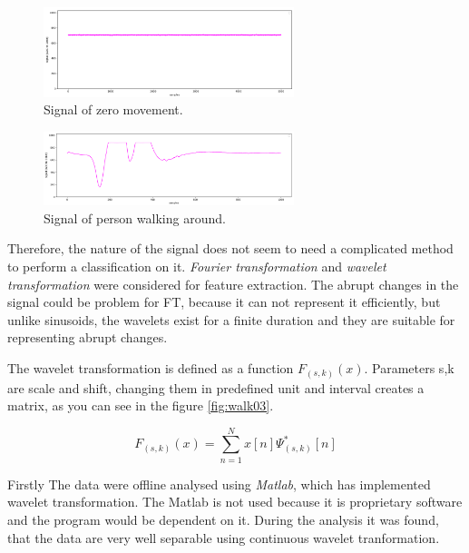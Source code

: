 \begin{figure}[h!]
\begin{center}
\includegraphics[width=0.65\textwidth]{render/signal_calm.png}
\caption{Signal of zero movement.\label{fig:signalcalm}}
\end{center}
\end{figure}

\begin{figure}[h!]
\begin{center}
\includegraphics[width=0.65\textwidth]{render/signal_walk.png}
\caption{Signal of person walking around.\label{fig:signalwalk}}
\end{center}
\end{figure}

Therefore, the nature of the signal does not seem to need a complicated method to perform a classification on it.
{\it Fourier transformation} and {\it wavelet transformation} were considered for feature
extraction. The abrupt changes in the signal could be problem for FT, because it can not represent
it efficiently\cite{SinglePIR}, %
but unlike sinusoids, the wavelets exist for a finite duration and they are suitable for representing
abrupt changes.

The wavelet transformation is defined as a function $F_{(s,k)}(x)$. Parameters s,k are scale and shift, changing
them in predefined unit and interval creates a matrix, as you can see in the figure \ref{fig:walk03}.

\begin{equation}
F_{(s,k)}(x) = \sum_{n=1}^{N} x[n] \Psi_{(s,k)}^{*}[n]
\end{equation}

Firstly The data were offline analysed using {\it Matlab}, which has implemented wavelet transformation.
The Matlab is not used because it is proprietary software and the program would be dependent on it.
During the analysis it was found, that the data are very well separable using continuous wavelet tranformation.

